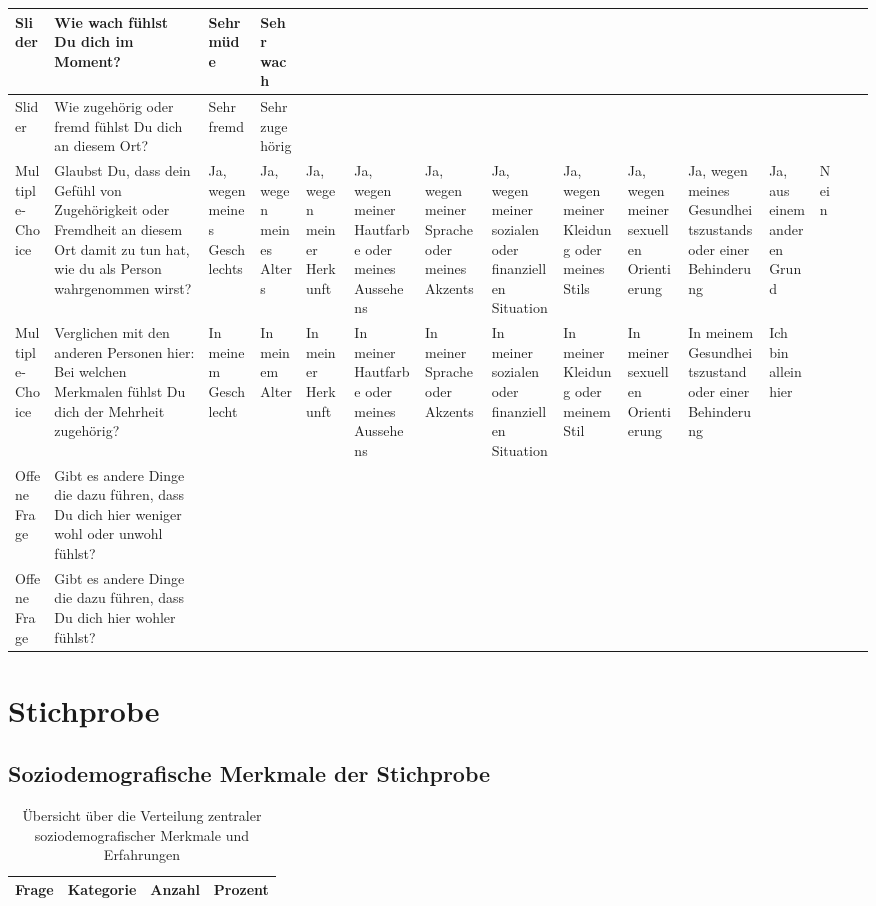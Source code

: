 \begin{appendices}
\begin{landscape}
\begin{longtable}{p{1.2cm} p{3.8cm} *{13}{p{1cm}}}
\midrule
Slider & Wie wach fühlst Du dich im Moment? & Sehr müde & Sehr wach &  &  &  &  &  &  &  &  &  &  & \\
\midrule
Slider & Wie zugehörig oder fremd fühlst Du dich an diesem Ort? & Sehr fremd & Sehr zugehörig &  &  &  &  &  &  &  &  &  &  & \\
\midrule
Multiple-Choice & Glaubst Du, dass dein Gefühl von Zugehörigkeit oder Fremdheit an diesem Ort damit zu tun hat, wie du als Person wahrgenommen wirst? & Ja, wegen meines Geschlechts & Ja, wegen meines Alters & Ja, wegen meiner Herkunft & Ja, wegen meiner Hautfarbe oder meines Aussehens & Ja, wegen meiner Sprache oder meines Akzents & Ja, wegen meiner sozialen oder finanziellen Situation & Ja, wegen meiner Kleidung oder meines Stils & Ja, wegen meiner sexuellen Orientierung & Ja, wegen meines Gesundheitszustands oder einer Behinderung & Ja, aus einem anderen Grund & Nein &  & \\
\midrule
Multiple-Choice & Verglichen mit den anderen Personen hier: Bei welchen Merkmalen fühlst Du dich der Mehrheit zugehörig? & In meinem Geschlecht & In meinem Alter & In meiner Herkunft & In meiner Hautfarbe oder meines Aussehens & In meiner Sprache oder Akzents & In meiner sozialen oder finanziellen Situation & In meiner Kleidung oder meinem Stil & In meiner sexuellen Orientierung & In meinem Gesundheitszustand oder einer Behinderung & Ich bin allein hier &  &  & \\
\midrule
Offene Frage & Gibt es andere Dinge die dazu führen, dass Du dich hier weniger wohl oder unwohl fühlst? &  &  &  &  &  &  &  &  &  &  &  &  & \\
\midrule
Offene Frage & Gibt es andere Dinge die dazu führen, dass Du dich hier wohler fühlst? &  &  &  &  &  &  &  &  &  &  &  &  & \\
\bottomrule
\end{longtable}
    
\end{landscape}




\section{Stichprobe}
\subsection{Soziodemografische Merkmale der Stichprobe}
\label{app:appendix_demographics}

\begin{longtable}{p{5.5cm}p{5.5cm}rr}
    \caption{Übersicht über die Verteilung zentraler soziodemografischer Merkmale und Erfahrungen}
    \label{tab:soziodemografie_gesamt}\\
    \toprule
    Frage & Kategorie & Anzahl & Prozent \\
    \midrule
    \endfirsthead


\end{longtable}
\end{appendices}
